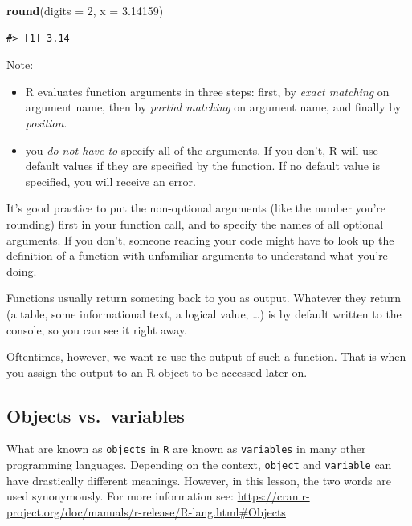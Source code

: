 \documentclass[
]{book}
\newenvironment{Shaded}{\begin{snugshade}}{\end{snugshade}}
\newcommand{\AttributeTok}[1]{\textcolor[rgb]{0.13,0.29,0.53}{#1}}
\newcommand{\DecValTok}[1]{\textcolor[rgb]{0.00,0.00,0.81}{#1}}
\newcommand{\FloatTok}[1]{\textcolor[rgb]{0.00,0.00,0.81}{#1}}
\newcommand{\FunctionTok}[1]{\textcolor[rgb]{0.13,0.29,0.53}{\textbf{#1}}}
\newcommand{\NormalTok}[1]{#1}
\begin{document}
\begin{Shaded}
\begin{Highlighting}[]
\FunctionTok{round}\NormalTok{(}\AttributeTok{digits =} \DecValTok{2}\NormalTok{, }\AttributeTok{x =} \FloatTok{3.14159}\NormalTok{)}
\end{Highlighting}
\end{Shaded}

\begin{verbatim}
#> [1] 3.14
\end{verbatim}

Note:

\begin{itemize}
\item
  R evaluates function arguments in three steps: first, by \emph{exact matching} on argument name, then by \emph{partial matching} on argument name, and finally by \emph{position}.
\item
  you \emph{do not have to} specify all of the arguments. If you don't, R will use default values if they are specified by the function. If no default value is specified, you will receive an error.
\end{itemize}

It's good practice to put the non-optional arguments (like the number you're
rounding) first in your function call, and to specify the names of all optional
arguments. If you don't, someone reading your code might have to look up the
definition of a function with unfamiliar arguments to understand what you're
doing.

Functions usually return someting back to you as output. Whatever they return (a table, some informational text, a logical value, \ldots) is by default written to the console, so you can see it right away.

Oftentimes, however, we want re-use the output of such a function. That is when you assign the output to an R object to be accessed later on.

\hypertarget{objects-vs.-variables}{%
\subsection{Objects vs.~variables}\label{objects-vs.-variables}}

What are known as \texttt{objects} in \texttt{R} are known as \texttt{variables} in many other
programming languages. Depending on the context, \texttt{object} and \texttt{variable} can
have drastically different meanings. However, in this lesson, the two words are
used synonymously. For more information see:
\url{https://cran.r-project.org/doc/manuals/r-release/R-lang.html\#Objects}
\end{document}
